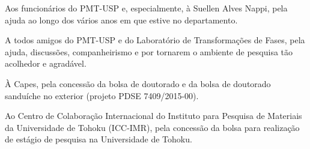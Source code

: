{  Aos funcionários do PMT-USP e, especialmente, à Suellen Alves Nappi, pela ajuda ao longo dos vários anos em que estive no departamento.

  A todos amigos do PMT-USP e do Laboratório de Transformações de Fases, pela ajuda, discussões, companheirismo e por tornarem o ambiente de pesquisa tão acolhedor e agradável.

  À Capes, pela concessão da bolsa de doutorado e da bolsa de doutorado sanduíche no exterior (projeto PDSE 7409/2015-00).

  Ao Centro de Colaboração Internacional do Instituto para Pesquisa de Materiais da Universidade de Tohoku (ICC-IMR), pela concessão da bolsa para realização de estágio de pesquisa na Universidade de Tohoku.
}



\edicaocorrigida
{}
